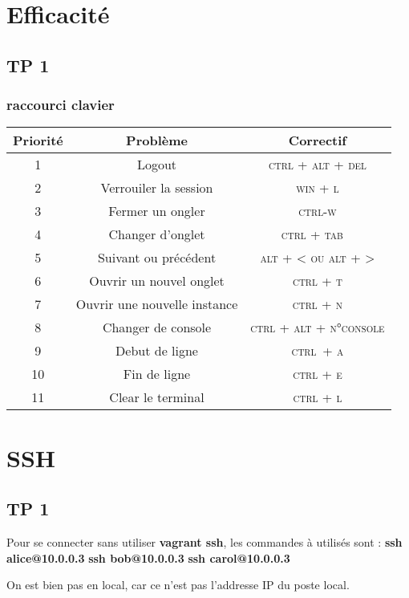 \documentclass{report}
\begin{document}
\chapter{Efficacité}
\section{TP 1}
 
\subsection{raccourci clavier}
\begin{tabular}{|c|c|c|}
	\hline
	\textbf{Priorité} &  \textbf{Problème} & \textbf{Correctif} \\ 
	\hline
	1 & Logout & \textsc{ctrl + alt + del} \\
	\hline
	2 & Verrouiler la session & \textsc{win + l} \\
	\hline  
	3 & Fermer un ongler & \textsc{ctrl-w} \\
	\hline
	4 & Changer d'onglet & \textsc{ctrl + tab}  \\
	\hline
	5 & Suivant ou précédent & \textsc{alt + < ou alt + >} \\
	\hline 
	6 & Ouvrir un nouvel onglet & \textsc{ctrl + t} \\
	\hline
	7 & Ouvrir une nouvelle instance & \textsc{ctrl + n} \\
	\hline 
	8 & Changer de console & \textsc{ctrl + alt + n°console} \\
	\hline 
	9 & Debut de ligne & \textsc{ctrl + a} \\
	\hline 
	10 & Fin de ligne & \textsc{ctrl + e} \\
	\hline 
	11 & Clear le terminal & \textsc{ctrl + l} \\
	\hline 
\end{tabular}


\chapter{SSH}

\section{TP 1}
Pour se connecter sans utiliser \textbf{vagrant ssh}, les commandes à utilisés sont : 
\textbf{ssh alice@10.0.0.3}
\textbf{ssh bob@10.0.0.3}
\textbf{ssh carol@10.0.0.3}

On est bien pas en local, car ce n'est pas l'addresse IP du poste local.
\end{document}
